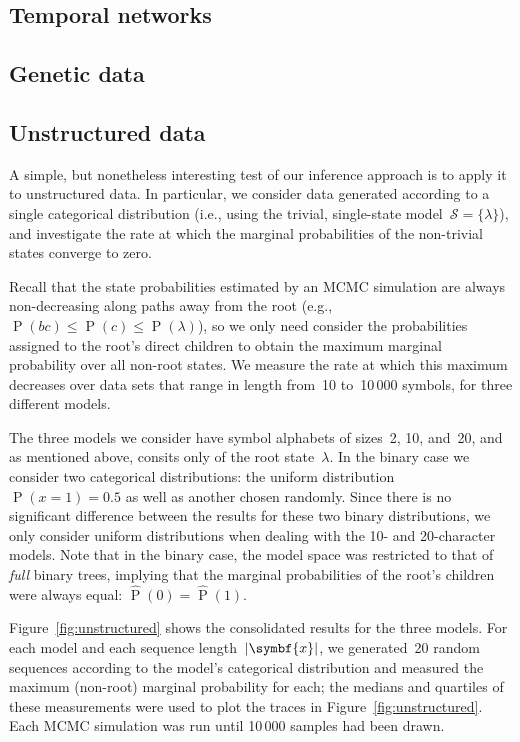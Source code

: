 \documentclass[12pt,a4paper]{article}
\newcommand\mc[1]{\mathcal{#1}}               %
\newcommand\ub[1]{\symbf{#1}}                 %
\DeclareMathOperator\Pb{P}                    %
\DeclarePairedDelimiter\abs{\lvert}{\rvert}   %
\newcommand\peq{\mathop{=}}   %
\begin{document}
\subsection{Temporal networks}\label{sec:temporal networks} %



\subsection{Genetic data}\label{sec:genetic} %

\subsection{Unstructured data}\label{sec:unstructured} %

A simple, but nonetheless interesting test of our inference approach is to apply
it to unstructured data. In particular, we consider data generated according to
a single categorical distribution (i.e., using the trivial, single-state
model~\(\mc{S} = \{\lambda\}\)), and investigate the rate at which the marginal
probabilities of the non-trivial states converge to zero.

Recall that the state probabilities estimated by an MCMC simulation are always
non-decreasing along paths away from the root (e.g., \(\Pb(bc) \le \Pb(c) \le
\Pb(\lambda)\)), so we only need consider the probabilities assigned to the
root's direct children to obtain the maximum marginal probability over all
non-root states. We measure the rate at which this maximum decreases over data
sets that range in length from~10 to~10\,000 symbols, for three different
models.

The three models we consider have symbol alphabets of sizes~2, 10, and~20, and
as mentioned above, consits only of the root state~\(\lambda\). In the binary
case we consider two categorical distributions: the uniform distribution~\(\Pb(x
\peq 1) = 0.5\) as well as another chosen randomly. Since there is no
significant difference between the results for these two binary distributions,
we only consider uniform distributions when dealing with the 10- and
20-character models. Note that in the binary case, the model space was
restricted to that of \emph{full} binary trees, implying that the marginal
probabilities of the root's children were always equal: \(\hat{\Pb}(0) =
\hat{\Pb}(1)\).

Figure~\ref{fig:unstructured} shows the consolidated results for the three
models. For each model and each sequence length~\(\abs{\ub{x}}\), we
generated~20 random sequences according to the model's categorical distribution
and measured the maximum (non-root) marginal probability for each; the medians
and quartiles of these measurements were used to plot the traces in
Figure~\ref{fig:unstructured}. Each MCMC simulation was run until 10\,000
samples had been drawn.
%

\end{document}
